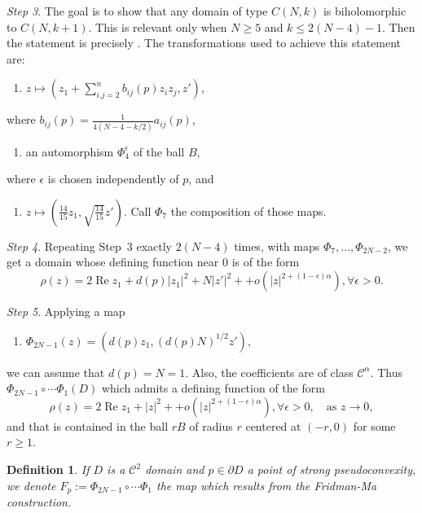 \documentclass[a4paper,12pt]{amsart}
\def\re{\operatorname{Re}}
\newtheorem{definition}[theorem]{Definition}
\theoremstyle{remark}\newtheorem{remark}[theorem]{Remark}
\begin{document}
\medskip

{\it Step 3}. The goal is to show that any domain of type $C(N,k)$ is biholomorphic to $C(N,k+1)$. This is relevant
only when $N\geq 5$ and $k\leq 2(N-4)-1$. Then the statement is precisely \cite[Lemma 3.4]{FM}. 
The transformations used to achieve this statement are:
\begin{enumerate}
\item[$vi)$] $z\mapsto  (z_1 + \sum_{i.j=2}^n b_{ij}(p) z_i z_j, z')$,
\end{enumerate}
where $b_{ij}(p) = \frac{1}{4(N-4-k/2)} a_{ij}(p)$,
\begin{enumerate}
\item[$vii)$] an automorphism $\Phi_4^\epsilon$ of the ball $B$,
\end{enumerate}
where $\epsilon$ is chosen independently of $p$, and
\begin{enumerate}
\item[$viii)$] $z\mapsto \left( \frac{14}{15} z_1, \sqrt{\frac{14}{15}} z'\right)$.
Call $\Phi_7$ the composition of those maps.
\end{enumerate}


\medskip

{\it Step 4}. Repeating Step~3 exactly $2(N-4)$ times, 
with maps $\Phi_7,\dots,\Phi_{2N-2}$,
we get a domain whose defining function near $0$ is of the form
\begin{equation}\label{eq:rho1}\rho(z) = 2 \re z_1 + d(p) |z_1|^2 + N|z'|^2 +  + o(|z|^{2+(1-\epsilon)\alpha}),
\forall \epsilon >0.
\end{equation}

\medskip

{\it Step 5}. Applying a map 
\begin{enumerate}\item[$ix)$] 
$\Phi_{2N-1}(z)= (d(p)z_1, (d(p)N)^{1/2} z'),$
\end{enumerate}
we can assume that $d(p)=N=1$. Also, the coefficients are of class $\mathcal C^\alpha$. Thus $\Phi_{2N-1}\circ \cdots \Phi_1(D)$
which admits a defining function  of the form 
\begin{equation}\label{rho}\rho(z) =2 \re z_1 + |z|^2 +  + o(|z|^{2+(1-\epsilon)\alpha}),
\forall \epsilon >0,\quad \text{as } z\to 0,
\end{equation}
and that is contained in the ball $rB$ of radius $r$ centered at $(-r,0)$ for some $r\geq 1$.



\begin{definition}
\label{fmmap}
If $D$ is a $\mathcal C^2$ domain
and $p\in \partial D$ a point of strong pseudoconvexity,
we denote  $F_p := \Phi_{2N-1}\circ \cdots \Phi_1$ the map
which results from the Fridman-Ma construction. 
\end{definition}
\medskip
\end{document}
